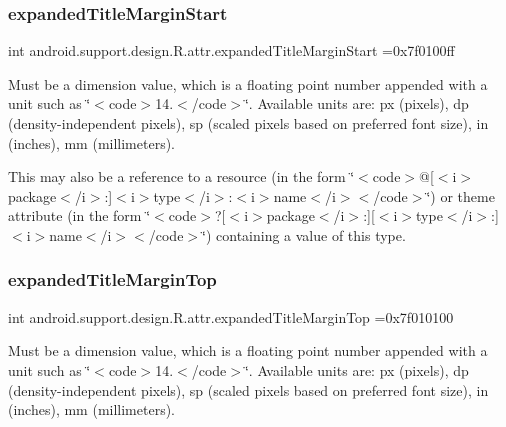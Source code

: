 \subsubsection{\texorpdfstring{expanded\+Title\+Margin\+Start}{expandedTitleMarginStart}}
{\footnotesize\ttfamily int android.\+support.\+design.\+R.\+attr.\+expanded\+Title\+Margin\+Start =0x7f0100ff\hspace{0.3cm}{\ttfamily [static]}}

Must be a dimension value, which is a floating point number appended with a unit such as \char`\"{}$<$code$>$14.\+5sp$<$/code$>$\char`\"{}. Available units are\+: px (pixels), dp (density-\/independent pixels), sp (scaled pixels based on preferred font size), in (inches), mm (millimeters). 

This may also be a reference to a resource (in the form \char`\"{}$<$code$>$@\mbox{[}$<$i$>$package$<$/i$>$\+:\mbox{]}$<$i$>$type$<$/i$>$\+:$<$i$>$name$<$/i$>$$<$/code$>$\char`\"{}) or theme attribute (in the form \char`\"{}$<$code$>$?\mbox{[}$<$i$>$package$<$/i$>$\+:\mbox{]}\mbox{[}$<$i$>$type$<$/i$>$\+:\mbox{]}$<$i$>$name$<$/i$>$$<$/code$>$\char`\"{}) containing a value of this type. \mbox{\label{classandroid_1_1support_1_1design_1_1R_1_1attr_a2a060c1031bda301907e94df7c9ac9a9}} 
\subsubsection{\texorpdfstring{expanded\+Title\+Margin\+Top}{expandedTitleMarginTop}}
{\footnotesize\ttfamily int android.\+support.\+design.\+R.\+attr.\+expanded\+Title\+Margin\+Top =0x7f010100\hspace{0.3cm}{\ttfamily [static]}}

Must be a dimension value, which is a floating point number appended with a unit such as \char`\"{}$<$code$>$14.\+5sp$<$/code$>$\char`\"{}. Available units are\+: px (pixels), dp (density-\/independent pixels), sp (scaled pixels based on preferred font size), in (inches), mm (millimeters). 

